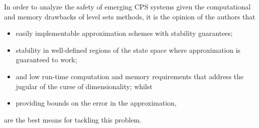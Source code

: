 \begin{comment}
\noindent \textbf{Contributions}:

 Since large systems often have sparse dynamics, we use fast Krylov-subspace simulation methods based on the Arnoldi or Lanczos iterations. Our implementation produces accurate counter-examples when properties are violated and, in the extreme case with sufficient problem structure, is shown to analyze a system with up to $n=x$ states. The basic notion of our contribution applies a variable resolution partitioning of high-dimensional state spaces using an extension of Moore and Atkeson's Parti-Games algorithm~\cite{Moore1995}.  Within each partition, since dense state spaces are often sparse, we exploit the sparsity of the state space and let the partitioning function decide upon a coarse or fine partitioning of cells. %

\begin{itemize}
	\item We first provide an ergodic metric and optimization analysis similar to~\cite{Abraham2021} that allows an agent's time-averaged statistics over its states to match the spatial statistics of a defined target distribution that intersects those states.
	\item We adaptively vary a cell's resolution (within a grid) based on a sparsity measure that determines if the information states in the grid are soarse or not;
	\item We then solve the next step of the Markov Decision Task, using the viscosity solution to the HJI problem in computing an optimal controller under the worst possible disturbance for an agent.
\end{itemize}
\end{comment}

In order to analyze the safety of emerging CPS systems given the computational and memory drawbacks of level sets methods, it is the opinion of the authors that  
%
\begin{itemize}
	\item easily implementable approximation schemes with %
	 stability guarantees; 
	\item stability in well-defined regions of the state space where approximation is guaranteed to work; %
	\item and   low run-time computation and memory requirements that address the jugular of the curse of dimensionality; whilst
	\item providing bounds on the error in the approximation,
\end{itemize}   
%
are the best means for tackling this problem.

